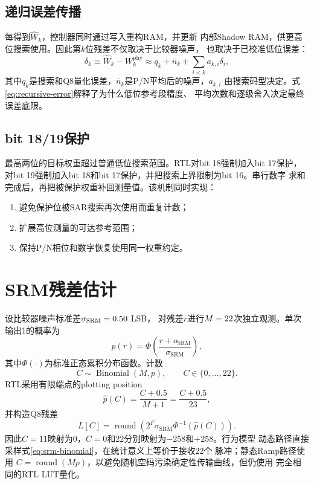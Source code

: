 \documentclass[11pt,a4paper,UTF8,fontset=none,openany]{ctexrep}
\numberwithin{equation}{chapter}
\numberwithin{figure}{chapter}
\numberwithin{table}{chapter}
\begin{document}
\subsection{递归误差传播}

每得到$\widehat{W}_k$，控制器同时通过写入重构RAM，并更新
内部Shadow RAM，供更高位搜索使用。因此第$k$位残差不仅取决于比较器噪声，
也取决于已校准低位误差：
\begin{equation}
  \delta_k
  \equiv \widehat{W}_k-W_k^{\mathrm{phy}}
  \approx q_k+\bar n_k+\sum_{i<k}a_{k,i}\delta_i,
  \label{eq:recursive-error}
\end{equation}
其中$q_k$是搜索和Q8量化误差，$\bar n_k$是P/N平均后的噪声，$a_{k,i}$
由搜索码型决定。式\eqref{eq:recursive-error}解释了为什么低位参考段精度、
平均次数和逐级舍入决定最终误差底限。

\subsection{bit 18/19保护}

最高两位的目标权重超过普通低位搜索范围。RTL对bit 18强制加入bit 17保护，
对bit 19强制加入bit 18和bit 17保护，并把搜索上界限制为bit 16。串行数字
求和完成后，再把被保护权重补回测量值。该机制同时实现：

\begin{enumerate}
  \item 避免保护位被SAR搜索再次使用而重复计数；
  \item 扩展高位测量的可达参考范围；
  \item 保持P/N相位和数字恢复使用同一权重约定。
\end{enumerate}

\section{SRM残差估计}

设比较器噪声标准差$\sigma_{\mathrm{SRM}}=0.50$ LSB，
对残差$r$进行$M=22$次独立观测。单次输出1的概率为
\begin{equation}
  p(r)=\Phi\!\left(\frac{r+o_{\mathrm{SRM}}}{\sigma_{\mathrm{SRM}}}\right),
  \label{eq:srm-probability}
\end{equation}
其中$\Phi(\cdot)$为标准正态累积分布函数。计数
\begin{equation}
  C\sim\operatorname{Binomial}(M,p),\qquad C\in\{0,\ldots,22\}.
  \label{eq:srm-binomial}
\end{equation}
RTL采用有限端点的plotting position
\begin{equation}
  \widehat p(C)=\frac{C+0.5}{M+1}=\frac{C+0.5}{23},
  \label{eq:srm-position}
\end{equation}
并构造Q8残差
\begin{equation}
  L[C]=\operatorname{round}
  \left(
    2^F\sigma_{\mathrm{SRM}}\Phi^{-1}\!\left(\widehat p(C)\right)
  \right).
  \label{eq:srm-lut}
\end{equation}
因此$C=11$映射为0，$C=0$和$22$分别映射为$-258$和$+258$。行为模型
动态路径直接采样式\eqref{eq:srm-binomial}，在统计意义上等价于接收22个
脉冲；静态Ramp路径使用
$C=\operatorname{round}(Mp)$，以避免随机空码污染确定性传输曲线，但仍使用
完全相同的RTL LUT量化。
\end{document}
